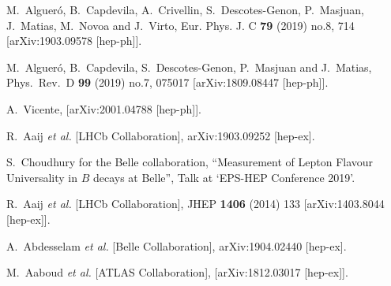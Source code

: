 \documentclass{beamer}
\begin{document}
\begin{thebibliography}{99}
	
	M.~Alguer\'o, B.~Capdevila, A.~Crivellin, S.~Descotes-Genon, P.~Masjuan, J.~Matias, M.~Novoa and J.~Virto,
	Eur. Phys. J. C \textbf{79} (2019) no.8, 714
	[arXiv:1903.09578 [hep-ph]].
	
	M.~Alguer\'o, B.~Capdevila, S.~Descotes-Genon, P.~Masjuan and J.~Matias,
	Phys.\ Rev.\ D {\bf 99} (2019) no.7,  075017
	[arXiv:1809.08447 [hep-ph]].
	
	A.~Vicente,
	[arXiv:2001.04788 [hep-ph]].
	
	R.~Aaij {\it et al.} [LHCb Collaboration],
	arXiv:1903.09252 [hep-ex].
	
	S.~Choudhury for the Belle collaboration, ``Measurement of Lepton Flavour Universality in $B$ decays at Belle'', Talk at `EPS-HEP Conference 2019'.
	
	R.~Aaij {\it et al.} [LHCb Collaboration],
	JHEP {\bf 1406} (2014) 133
	[arXiv:1403.8044 [hep-ex]].
	
	
	A.~Abdesselam {\it et al.} [Belle Collaboration],
	arXiv:1904.02440 [hep-ex].
	
	M.~Aaboud {\it et al.} [ATLAS Collaboration],
	[arXiv:1812.03017 [hep-ex]].
	

\end{thebibliography}
\end{document}
